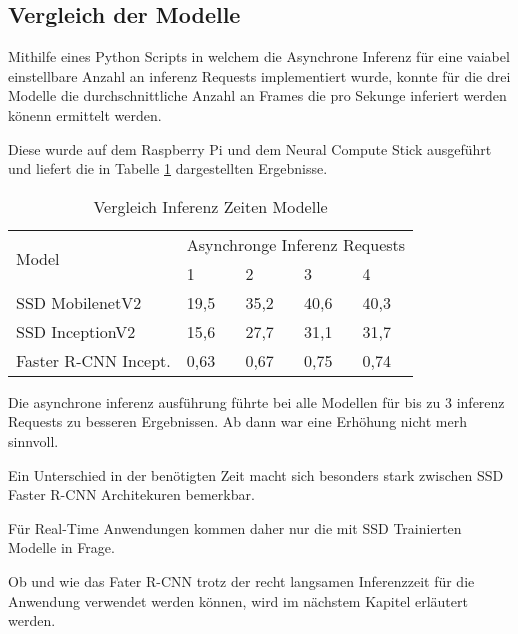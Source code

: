 



\subsection{Vergleich der Modelle}

Mithilfe eines Python Scripts in welchem die Asynchrone Inferenz 
für eine vaiabel einstellbare Anzahl an inferenz Requests
implementiert wurde, konnte für die drei Modelle die 
durchschnittliche Anzahl an Frames die pro Sekunge inferiert werden 
könenn ermittelt werden.

Diese wurde auf dem Raspberry Pi und dem Neural Compute Stick 
ausgeführt und liefert die in Tabelle \ref{table:infertime}
dargestellten Ergebnisse.

\vspace{1cm}
\begin{table}[htb]
  \centering
  \label{table:infertime}
  \begin{tabular}{m{}|m{}<{\centering}|m{}<{\centering}|m{}<{\centering}|m{}<{\centering}}
  \hline
  \multirow{2}{*}{Model} & \multicolumn{4}{c}{Asynchronge Inferenz Requests} \\ \cline{2-5} 
                         & 1           & 2          & 3          & 4          \\ \hline\hline
  SSD MobilenetV2        & 19,5           & 35,2          & 40,6          & 40,3          \\
  SSD InceptionV2        & 15,6           & 27,7          & 31,1          & 31,7          \\
  Faster R-CNN Incept.   & 0,63           & 0,67          & 0,75          & 0,74          \\ \hline
  \end{tabular}
  \caption{Vergleich Inferenz Zeiten Modelle}
\end{table}
\vspace{1cm}

Die asynchrone inferenz ausführung führte bei alle Modellen 
für bis zu 3 inferenz Requests zu besseren Ergebnissen.
Ab dann war eine Erhöhung nicht merh sinnvoll.

Ein Unterschied in der benötigten Zeit macht sich besonders 
stark zwischen SSD Faster R-CNN Architekuren bemerkbar.

Für Real-Time Anwendungen kommen daher nur die mit SSD Trainierten 
Modelle in Frage. 

Ob und wie das Fater R-CNN trotz der recht langsamen Inferenzzeit 
für die Anwendung verwendet werden können, wird im nächstem Kapitel 
erläutert werden.

